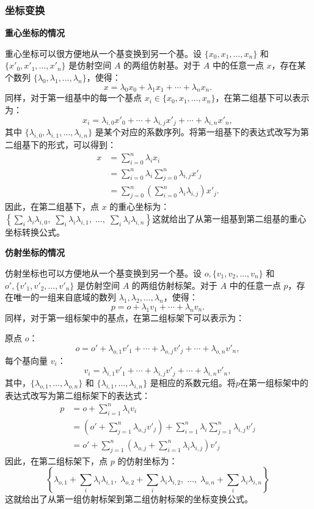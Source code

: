 \subsubsection{坐标变换}
\textbf{重心坐标的情况}

重心坐标可以很方便地从一个基变换到另一个基。设 $\{x_0, x_1, \dots, x_n\}$ 和 $\{x'_0, x'_1, \dots, x'_n\}$ 是仿射空间 $A$ 的两组仿射基。对于 $A$ 中的任意一点 $x$，存在某个数列 $\{\lambda_0, \lambda_1, \dots, \lambda_n\}$，使得：
$$
x = \lambda_0 x_0 + \lambda_1 x_1 + \cdots + \lambda_n x_n.~
$$
同样，对于第一组基中的每一个基点 $x_i \in \{x_0, x_1, \dots, x_n\}$，在第二组基下可以表示为：
$$
x_i = \lambda_{i,0} x'_0 + \cdots + \lambda_{i,j} x'_j + \cdots + \lambda_{i,n} x'_n,~
$$
其中 $\{\lambda_{i,0}, \lambda_{i,1}, \dots, \lambda_{i,n}\}$ 是某个对应的系数序列。将第一组基下的表达式改写为第二组基下的形式，可以得到：
$$
\begin{aligned}
x &= \sum_{i=0}^n \lambda_i x_i \\[6pt]
  &= \sum_{i=0}^n \lambda_i  \sum_{j=0}^n \lambda_{i,j} x'_j  \\[6pt]
  &= \sum_{j=0}^n \left( \sum_{i=0}^n \lambda_i \lambda_{i,j} \right) x'_j.
\end{aligned}~
$$
因此，在第二组基下，点 $x$ 的重心坐标为：$\left\{\sum_i \lambda_i \lambda_{i,0},\;\sum_i \lambda_i \lambda_{i,1},\;\dots,\;
\sum_i \lambda_i \lambda_{i,n}\right\}$这就给出了从第一组基到第二组基的重心坐标转换公式。

\textbf{仿射坐标的情况}

仿射坐标也可以方便地从一个基变换到另一个基。设 $o, \{v_1, v_2, \dots, v_n\}$ 和 $o', \{v'_1, v'_2, \dots, v'_n\}$ 是仿射空间 $A$ 的两组仿射标架。对于 $A$ 中的任意一点 $p$，存在唯一的一组来自底域的数列 $\lambda_1, \lambda_2, \dots, \lambda_n$，使得：
$$
p = o + \lambda_1 v_1 + \cdots + \lambda_n v_n.~
$$
同样，对于第一组标架中的基点，在第二组标架下可以表示为：

原点 $o$：
  $$
  o = o' + \lambda_{o,1} v'_1 + \cdots + \lambda_{o,j} v'_j + \cdots + \lambda_{o,n} v'_n,~
  $$
每个基向量 $v_i$：
  $$
  v_i = \lambda_{i,1} v'_1 + \cdots + \lambda_{i,j} v'_j + \cdots + \lambda_{i,n} v'_n,~
  $$
其中，$\{\lambda_{o,1}, \dots, \lambda_{o,n}\}$ 和 $\{\lambda_{i,1}, \dots, \lambda_{i,n}\}$ 是相应的系数元组。将$p$在第一组标架中的表达式改写为第二组标架下的表达式：
$$
\begin{aligned}
p
  &= o + \sum_{i=1}^{n} \lambda_i v_i \\
  &= \left(o' + \sum_{j=1}^{n} \lambda_{o,j} v'_j\right) + \sum_{i=1}^{n} \lambda_i \sum_{j=1}^{n} \lambda_{i,j} v'_j\\
  &= o' + \sum_{j=1}^{n} \left(\lambda_{o,j} + \sum_{i=1}^{n} \lambda_i \lambda_{i,j}\right) v'_j
\end{aligned}~
$$
因此，在第二组标架下，点 $p$ 的仿射坐标为：
$$
\left\{\lambda_{o,1} + \sum_i \lambda_i \lambda_{i,1},\;\lambda_{o,2} + \sum_i \lambda_i \lambda_{i,2},\;\dots,\;\lambda_{o,n} + \sum_i \lambda_i \lambda_{i,n}
\right\}~
$$
这就给出了从第一组仿射标架到第二组仿射标架的坐标变换公式。

